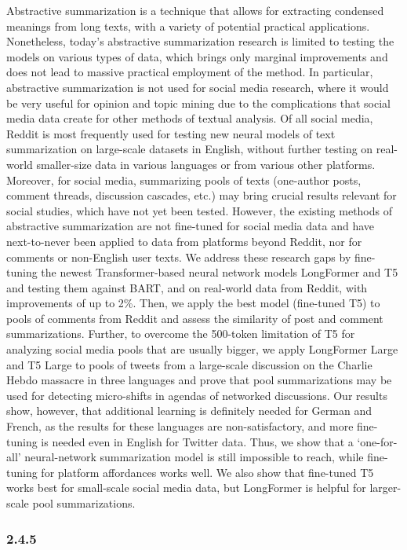 Abstractive summarization is a technique that allows for extracting condensed meanings from long texts, with a variety of potential practical applications. Nonetheless, today’s abstractive summarization research is limited to testing the models on various types of data, which brings only marginal improvements and does not lead to massive practical employment of the method. In particular, abstractive summarization is not used for social media research, where it would be very useful for opinion and topic mining due to the complications that social media data create for other methods of textual analysis. Of all social media, Reddit is most frequently used for testing new neural models of text summarization on large-scale datasets in English, without further testing on real-world smaller-size data in various languages or from various other platforms. Moreover, for social media, summarizing pools of texts (one-author posts, comment threads, discussion cascades, etc.) may bring crucial results relevant for social studies, which have not yet been tested. However, the existing methods of abstractive summarization are not fine-tuned for social media data and have next-to-never been applied to data from platforms beyond Reddit, nor for comments or non-English user texts. We address these research gaps by fine-tuning the newest Transformer-based neural network models LongFormer and T5 and testing them against BART, and on real-world data from Reddit, with improvements of up to 2\%. Then, we apply the best model (fine-tuned T5) to pools of comments from Reddit and assess the similarity of post and comment summarizations. Further, to overcome the 500-token limitation of T5 for analyzing social media pools that are usually bigger, we apply LongFormer Large and T5 Large to pools of tweets from a large-scale discussion on the Charlie Hebdo massacre in three languages and prove that pool summarizations may be used for detecting micro-shifts in agendas of networked discussions. Our results show, however, that additional learning is definitely needed for German and French, as the results for these languages are non-satisfactory, and more fine-tuning is needed even in English for Twitter data. Thus, we show that a ‘one-for-all’ neural-network summarization model is still impossible to reach, while fine-tuning for platform affordances works well. We also show that fine-tuned T5 works best for small-scale social media data, but LongFormer is helpful for larger-scale pool summarizations.

\subsubsection{2.4.5}


